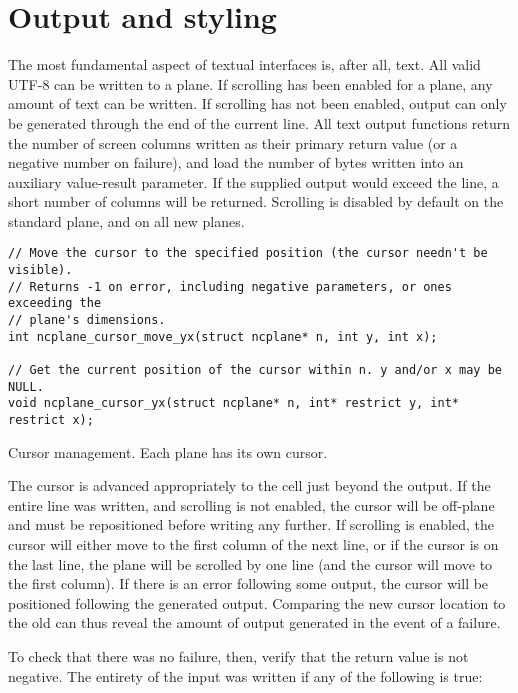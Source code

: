 \section{Output and styling}
\label{sec:output}
The most fundamental aspect of textual interfaces is, after all, text. All
valid UTF-8 can be written to a plane. If scrolling has been enabled for a
plane, any amount of text can be written. If scrolling has not been enabled,
output can only be generated through the end of the current line. All text
output functions return the number of screen columns written as their primary
return value (or a negative number on failure), and load the number of bytes
written into an auxiliary value-result parameter. If the supplied output would
exceed the line, a short number of columns will be returned. Scrolling is
disabled by default on the standard plane, and on all new planes.

\begin{listing}[!htbp]
\begin{verbatim}
// Move the cursor to the specified position (the cursor needn't be visible).
// Returns -1 on error, including negative parameters, or ones exceeding the
// plane's dimensions.
int ncplane_cursor_move_yx(struct ncplane* n, int y, int x);

// Get the current position of the cursor within n. y and/or x may be NULL.
void ncplane_cursor_yx(struct ncplane* n, int* restrict y, int* restrict x);
\end{verbatim}
\caption{Cursor management. Each plane has its own cursor.}
\label{list:cursor}
\end{listing}

The cursor is advanced appropriately to the cell just beyond the output. If the
entire line was written, and scrolling is not enabled, the cursor will be
off-plane and must be repositioned before writing any further. If scrolling is
enabled, the cursor will either move to the first column of the next line, or
if the cursor is on the last line, the plane will be scrolled by one line (and
the cursor will move to the first column). If there is an error following some
output, the cursor will be positioned following the generated output. Comparing
the new cursor location to the old can thus reveal the amount of output generated
in the event of a failure.

To check that there was no failure, then, verify that the return value is not
negative. The entirety of the input was written if any of the following is
true:

